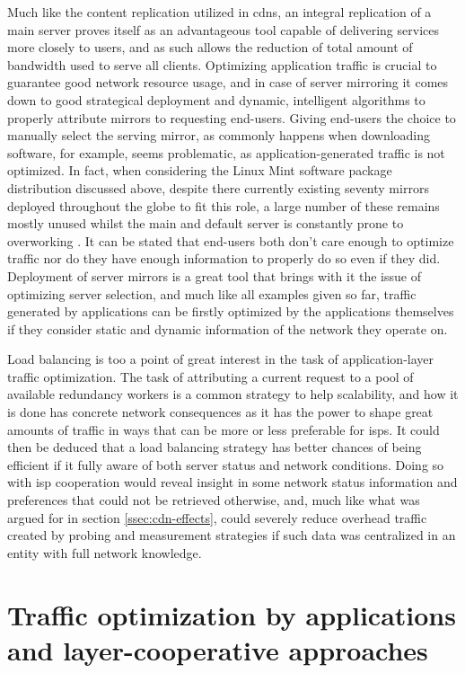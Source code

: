     Much like the content replication utilized in \glspl{cdn}, an integral replication of a main server proves itself as an advantageous tool capable of delivering services more closely to users, and as such allows the reduction of total amount of bandwidth used to serve all clients.
    Optimizing application traffic is crucial to guarantee good network resource usage, and in case of server mirroring it comes down to good strategical deployment and dynamic, intelligent algorithms to properly attribute mirrors to requesting end-users.
    Giving end-users the choice to manually select the serving mirror, as commonly happens when downloading software, for example, seems problematic, as application-generated traffic is not optimized.
    In fact, when considering the Linux Mint software package distribution discussed above, despite there currently existing seventy mirrors deployed throughout the globe to fit this role, a large number of these remains mostly unused whilst the main and default server is constantly prone to overworking \cite{mint-article}.
    It can be stated that end-users both don't care enough to optimize traffic nor do they have enough information to properly do so even if they did.
    Deployment of server mirrors is a great tool that brings with it the issue of optimizing server selection, and much like all examples given so far, traffic generated by applications can be firstly optimized by the applications themselves if they consider static and dynamic information of the network they operate on.

    Load balancing is too a point of great interest in the task of application-layer traffic optimization.
    The task of attributing a current request to a pool of available redundancy workers is a common strategy to help scalability, and how it is done has concrete network consequences as it has the power to shape great amounts of traffic in ways that can be more or less preferable for \glspl{isp}.
    It could then be deduced that a load balancing strategy has better chances of being efficient if it fully aware of both server status and network conditions.
    Doing so with \gls{isp} cooperation would reveal insight in some network status information and preferences that could not be retrieved otherwise, and, much like what was argued for in section \ref{ssec:cdn-effects}, could severely reduce overhead traffic created by probing and measurement strategies if such data was centralized in an entity with full network knowledge.

\section{Traffic optimization by applications and layer-cooperative approaches}

